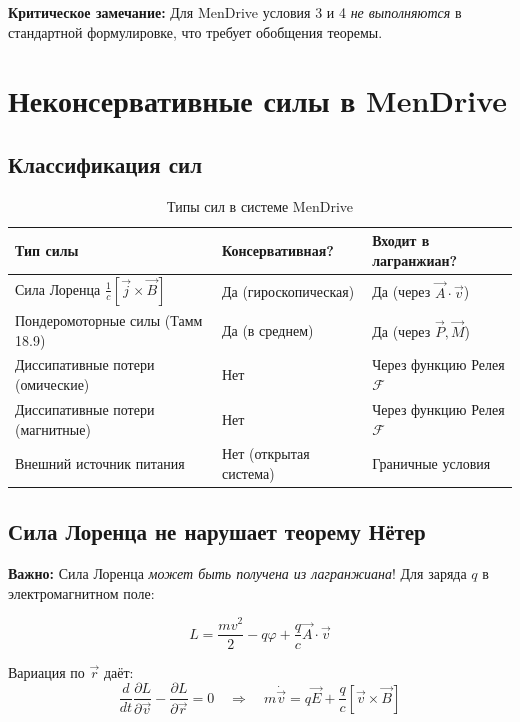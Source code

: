 \documentclass[a4paper,12pt]{article}
\begin{document}
\textbf{Критическое замечание:} Для MenDrive условия 3 и 4 \textit{не
выполняются} в стандартной формулировке, что требует обобщения теоремы.

\section{Неконсервативные силы в MenDrive}

\subsection{Классификация сил}

\begin{table}[h]
\centering
\caption{Типы сил в системе MenDrive}
\label{tab:force_classification}
\begin{tabular}{@{}lll@{}}
\toprule
\textbf{Тип силы} & \textbf{Консервативная?} & \textbf{Входит в лагранжиан?} \\
\midrule
Сила Лоренца $\frac{1}{c}[\vec{j}\times\vec{B}]$ & Да (гироскопическая) & Да (через $\vec{A}\cdot\vec{v}$) \\
Пондеромоторные силы (Тамм 18.9) & Да (в среднем) & Да (через $\vec{P}, \vec{M}$) \\
Диссипативные потери (омические) & Нет & Через функцию Релея $\mathcal{F}$ \\
Диссипативные потери (магнитные) & Нет & Через функцию Релея $\mathcal{F}$ \\
Внешний источник питания & Нет (открытая система) & Граничные условия \\
\bottomrule
\end{tabular}
\end{table}

\subsection{Сила Лоренца не нарушает теорему Нётер}

\textbf{Важно:} Сила Лоренца \textit{может быть получена из лагранжиана}!
Для заряда $q$ в электромагнитном поле:

\begin{equation}
L = \frac{mv^2}{2} - q\varphi + \frac{q}{c}\vec{A}\cdot\vec{v}
\label{eq:lorentz_lagrangian}
\end{equation}

Вариация по $\vec{r}$ даёт:
\begin{equation}
\frac{d}{dt}\frac{\partial L}{\partial \vec{v}} - \frac{\partial L}{\partial \vec{r}} = 0
\quad \Rightarrow \quad m\dot{\vec{v}} = q\vec{E} + \frac{q}{c}[\vec{v}\times\vec{B}]
\label{eq:lorentz_from_lagrangian}
\end{equation}
\end{document}
